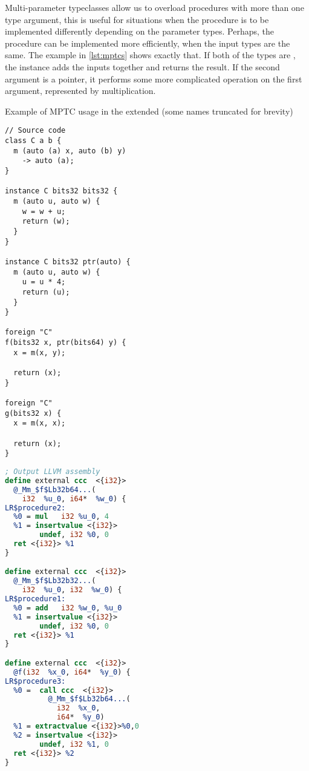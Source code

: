 Multi-parameter typeclasses allow us to overload procedures with more than one type argument, this is useful for situations when the procedure is to be implemented differently depending on the parameter types. Perhaps, the procedure can be implemented more efficiently, when the input types are the same. The example in \cref{lst:mptcs} shows exactly that. If both of the types are , the instance adds the inputs together and returns the result. If the second argument is a pointer, it performs some more complicated operation on the first argument, represented by multiplication.
\begin{listing}
    \small
    \caption{Example of MPTC usage in the extended \cmm (some names truncated for brevity)}
    \label{lst:mptcs}
    \begin{center}
    \begin{minipage}{0.5\linewidth}
    \begin{lstlisting}[basicstyle=\scriptsize\ttfamily]
// Source code
class C a b {
  m (auto (a) x, auto (b) y)
    -> auto (a);
}

instance C bits32 bits32 {
  m (auto u, auto w) {
    w = w + u;
    return (w);
  }
}

instance C bits32 ptr(auto) {
  m (auto u, auto w) {
    u = u * 4;
    return (u);
  }
}

foreign "C"
f(bits32 x, ptr(bits64) y) {
  x = m(x, y);

  return (x);
}

foreign "C"
g(bits32 x) {
  x = m(x, x);

  return (x);
}
    \end{lstlisting}
    \end{minipage}%
    \begin{minipage}{0.5\linewidth}
    \begin{lstlisting}[language=LLVM, basicstyle=\scriptsize\ttfamily]
; Output LLVM assembly
define external ccc  <{i32}>
  @_Mm_$f$Lb32b64...(
    i32  %u_0, i64*  %w_0) {
LR$procedure2:
  %0 = mul   i32 %u_0, 4
  %1 = insertvalue <{i32}>
        undef, i32 %0, 0
  ret <{i32}> %1
}

define external ccc  <{i32}>
  @_Mm_$f$Lb32b32...(
    i32  %u_0, i32  %w_0) {
LR$procedure1:
  %0 = add   i32 %w_0, %u_0
  %1 = insertvalue <{i32}>
        undef, i32 %0, 0
  ret <{i32}> %1
}

define external ccc  <{i32}>
  @f(i32  %x_0, i64*  %y_0) {
LR$procedure3:
  %0 =  call ccc  <{i32}>
          @_Mm_$f$Lb32b64...(
            i32  %x_0,
            i64*  %y_0)
  %1 = extractvalue <{i32}>%0,0
  %2 = insertvalue <{i32}>
        undef, i32 %1, 0
  ret <{i32}> %2
}


\end{lstlisting}
\end{minipage}
\end{center}
\end{listing}
